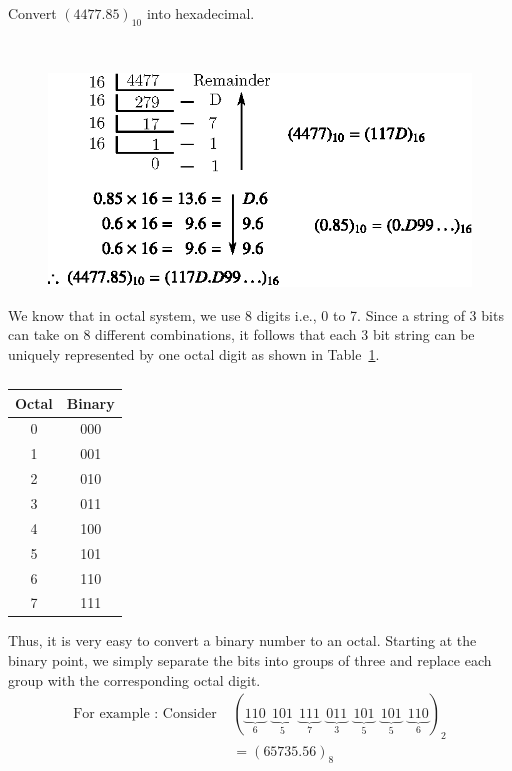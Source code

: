 \begin{problem}\label{prob5.17}
Convert $(4477.85)_{10}$ into hexadecimal.
\end{problem}

\begin{solution}
~
\begin{figure}[H]
\centering
\includegraphics{chap5/div18.eps}
\end{figure}
\end{solution}

\smallskip
{}

We know that in octal system, we use 8 digits i.e., 0 to 7. Since a string of 3 bits can take on 8 different combinations, it follows that each 3 bit string can be uniquely represented by one octal digit as shown in Table~\ref{tab7.1}.
\begin{table}[H]
\centering
\caption{}\label{tab7.1}
\renewcommand{\arraystretch}{1.2}
\tabcolsep=15pt
\begin{tabular}{|c|c|}
\hline
{\bf Octal} & {\bf Binary}\\[3pt]
\hline
0 & 000\\
1 & 001\\
2 & 010\\
3 & 011\\
4 & 100\\
5 & 101\\
6 & 110\\
7 & 111\\
\hline
\end{tabular}
\end{table}

Thus, it is very easy to convert a binary number to an octal. Starting at the binary point, we simply separate the bits into groups of three and replace each group with the corresponding octal digit.
\begin{align*}
\text{For example~: Consider~} & (\underbrace{110}_{6} \ \ \underbrace{101}_{5} \ \ \underbrace{111}_{7} \ \ \underbrace{011}_{3} \ \ \underbrace{101}_{5} \ \ \underbrace{101}_{5} \ \ \underbrace{110}_{6})_{2}\\[4pt]
&= (65735.56)_{8}
\end{align*}


